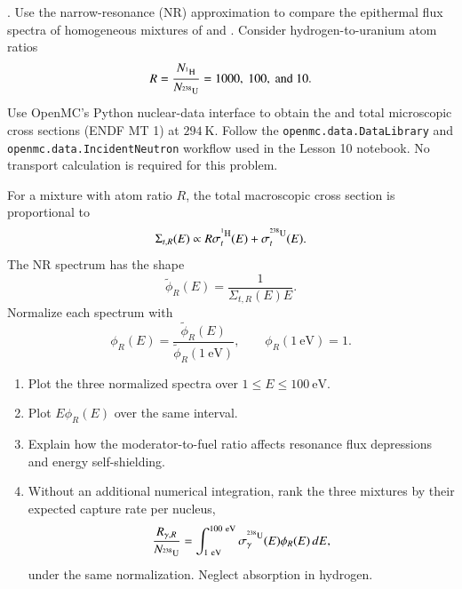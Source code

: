 
. Use the narrow-resonance (NR) approximation to
compare the epithermal flux spectra of homogeneous mixtures of
 and . Consider hydrogen-to-uranium atom ratios
\[
 R=\frac{N_{\isoA{H}{1}}}{N_{\isoA{U}{238}}}=1000,\ 100,\ \text{and }10.
\]
Use OpenMC's Python nuclear-data interface to obtain the  and
 total microscopic cross sections (ENDF MT 1) at
$294~\mathrm{K}$. Follow the \texttt{openmc.data.DataLibrary} and
\texttt{openmc.data.IncidentNeutron} workflow used in the Lesson 10 notebook.
No transport calculation is required for this problem.

For a mixture with atom ratio $R$, the total macroscopic cross section is
proportional to
\[
 \Sigma_{t,R}(E)\propto
 R\sigma_t^{\isoA{H}{1}}(E)+\sigma_t^{\isoA{U}{238}}(E).
\]
The NR spectrum has the shape
\[
 \widetilde{\phi}_R(E)=\frac{1}{\Sigma_{t,R}(E)E}.
\]
Normalize each spectrum with
\[
 \phi_R(E)=\frac{\widetilde{\phi}_R(E)}
                {\widetilde{\phi}_R(1~\mathrm{eV})},
 \qquad \phi_R(1~\mathrm{eV})=1.
\]
\begin{enumerate}[label=(\alph*)]
\item Plot the three normalized spectra over $1\le E\le100~\mathrm{eV}$.
\item Plot $E\phi_R(E)$ over the same interval.
\item Explain how the moderator-to-fuel ratio affects resonance flux
      depressions and energy self-shielding.
\item Without an additional numerical integration, rank the three mixtures by
      their expected  capture rate per  nucleus,
\[
 \frac{R_{\gamma,R}}{N_{\isoA{U}{238}}}
 =\int_{1~\mathrm{eV}}^{100~\mathrm{eV}}
  \sigma_\gamma^{\isoA{U}{238}}(E)\phi_R(E)\,dE,
\]
      under the same normalization. Neglect absorption in hydrogen.
\end{enumerate}

